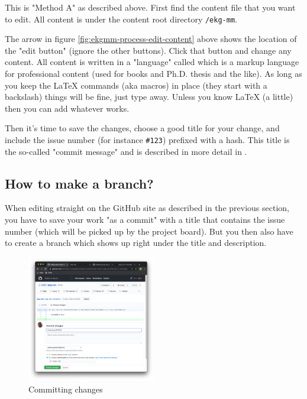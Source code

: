 This is "Method A" as described above.
First find the content file that you want to edit.
All content is under the content root directory \texttt{/ekg-mm}.

The arrow in figure \ref{fig:ekgmm-process-edit-content} above shows the
location of the "edit button" (ignore the other buttons). 
Click that button and change any content. 
All content is written in a "language" called  which is
a markup language for professional content (used for books and Ph.D. 
thesis and the like).
As long as you keep the LaTeX commands (aka macros) in place (they 
start with a backslash) things will be fine, just type away. 
Unless you know LaTeX (a little) then you can add whatever works.

Then it’s time to save the changes, choose a good title for your 
change, and include the issue number (for instance \texttt{\#123})
prefixed with a hash.
This title is the so-called "commit message" and is described in 
more detail in .

\subsection{How to make a branch?}
\label{subsec:ekg-mm-process-how-to-make-a-branch}

When editing straight on the GitHub site as described in the previous 
section, you have to save your work "as a commit" with a title that 
contains the issue number (which will be picked up by the project board). 
But you then also have to create a branch which shows up right under 
the title and description. 

%
%
\begin{figure}
    \vspace{-12pt}
    \begin{center}
        \includegraphics[width=0.50\textwidth]{../images/ekgmm-process-commit-changes.png}
    \end{center}
    \caption{Committing changes}
    \label{fig:ekgmm-process-commit-changes}
\end{figure}

